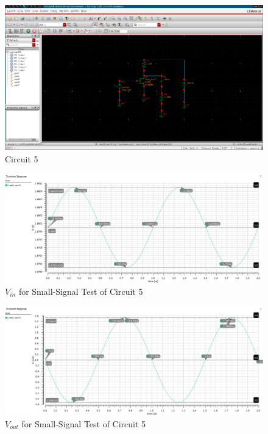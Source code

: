 \FloatBarrier

\begin{figure}[h!]
	\centering
	\includegraphics[scale=0.30]{./images/circuit5.PNG}
	\caption{Circuit 5}
	\label{fig:circuit5}
\end{figure}

\FloatBarrier

\FloatBarrier

\begin{figure}[h!]
	\centering
	\includegraphics[scale=0.45]{./images/sim5_vin.PNG}
	\caption{$V_{in}$ for Small-Signal Test of Circuit 5}
	\label{fig:sim5_vin}
\end{figure}

\FloatBarrier

\FloatBarrier

\begin{figure}[h!]
	\centering
	\includegraphics[scale=0.45]{./images/sim5_vout.PNG}
	\caption{$V_{out}$ for Small-Signal Test of Circuit 5}
	\label{fig:sim5_vout}
\end{figure}

